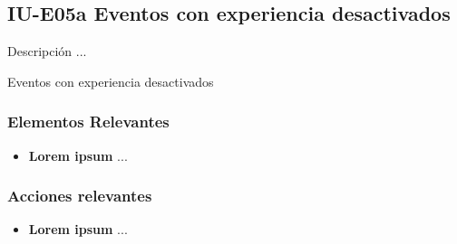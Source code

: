 
\subsection{IU-E05a Eventos con experiencia desactivados}

 Descripción ...

    {Eventos con experiencia desactivados}

\subsubsection{Elementos Relevantes}

    \begin{itemize}
    \item {\bf Lorem ipsum}
        ...
    \end{itemize}

\subsubsection{Acciones relevantes}

    \begin{itemize}
    \item {\bf Lorem ipsum}
        ...
    \end{itemize}

\clearpage
